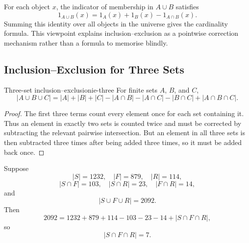 \begin{extension}[title={Indicator-style intuition for the two-set formula}]
For each object $x$, the indicator of membership in $A\cup B$ satisfies
\[
1_{A\cup B}(x)=1_A(x)+1_B(x)-1_{A\cap B}(x).
\]
Summing this identity over all objects in the universe gives the cardinality formula. This viewpoint explains inclusion--exclusion as a pointwise correction mechanism rather than a formula to memorise blindly.
\end{extension}

\subsection{Inclusion--Exclusion for Three Sets}

\begin{theorem}{Three-set inclusion--exclusion}{ie-three}
For finite sets $A$, $B$, and $C$,
\[
|A\cup B\cup C|
=
|A|+|B|+|C|
-|A\cap B|-|A\cap C|-|B\cap C|
+|A\cap B\cap C|.
\]
\end{theorem}

\begin{proof}
The first three terms count every element once for each set containing it. Thus an element in exactly two sets is counted twice and must be corrected by subtracting the relevant pairwise intersection. But an element in all three sets is then subtracted three times after being added three times, so it must be added back once.
\end{proof}

\begin{center}
\end{center}

\begin{examplebox}[title={Spanish, French, and Russian courses}]
Suppose
\[
|S|=1232,\quad |F|=879,\quad |R|=114,
\]
\[
|S\cap F|=103,\quad |S\cap R|=23,\quad |F\cap R|=14,
\]
and
\[
|S\cup F\cup R|=2092.
\]
Then
\[
2092=1232+879+114-103-23-14+|S\cap F\cap R|,
\]
so
\[
|S\cap F\cap R|=7.
\]
\end{examplebox}

